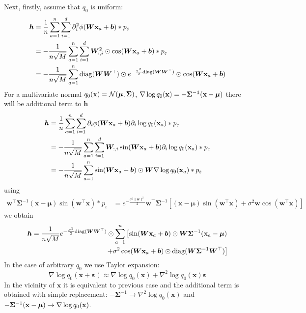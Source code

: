     Next, firstly, assume that $q_0$ is uniform:
    \begin{align*}
        {\bm h}
        &= \frac{1}{n}\sum_{a = 1}^n\sum_{i = 1}^d \partial_i^2 \phi(\bm{W}{\bf x}_a + \bm{b}) * p_{\varepsilon}\\
        &= -\frac{1}{n\sqrt{M}}\sum_{a = 1}^n\sum_{i = 1}^d \bm{W}_{:, i}^2 \odot \cos(\bm{W}{\bf x}_a + \bm{b}) * p_{\varepsilon}\\
        &= -\frac{1}{n\sqrt{M}}\sum_{a = 1}^n {\rm diag}(\bm{W}\bm{W}^{\top})\odot e^{-\frac{\sigma^2}{2}{\rm diag}(\bm{W}\bm{W}^{\top})} \odot \cos(\bm{W}{\bf x}_a + \bm{b})
    \end{align*}
    For a multivariate normal $q_0(\bf x) = {\cal N}({\bm \mu}, {\bm \Sigma})$, $\nabla\log q_0(\bf x) = -{\bm \Sigma}^{-1}({\bf x} - {\bm \mu})$ there will be additional term to ${\bm h}$
    \begin{align*}
        {\bm h}
        &= \frac{1}{n}\sum_{a = 1}^n\sum_{i = 1}^d \partial_i \phi(\bm{W}{\bf x}_a + \bm{b})\partial_i \log q_0({\bf x}_a) * p_{\varepsilon}\\
        &= -\frac{1}{n\sqrt{M}}\sum_{a = 1}^n\sum_{i = 1}^d \bm{W}_{:, i}\sin(\bm{W}{\bf x}_a + \bm{b})\partial_i \log q_0({\bf x}_a) * p_{\varepsilon}\\
        &= -\frac{1}{n\sqrt{M}} \sum_{a = 1}^n \sin(\bm{W}{\bf x}_a + \bm{b}) \odot \bm{W} \nabla\log q_0({\bf x}_a) * p_{\varepsilon}
    \end{align*}
    using
    \begin{align*}
    \mathbf{w}^\top {\bm \Sigma}^{-1}(\mathbf{x} - {\bm \mu}) \sin (\mathbf{w}^\top \mathbf{x}) * p_{\varepsilon}
    &=
    e^{-\frac{\sigma^2 \|\mathbf{w}\|^2}{2}}
    \mathbf{w}^\top{\bm \Sigma}^{-1}\left [
        (\mathbf{x} - {\bm \mu})\sin(\mathbf{w}^\top \mathbf{x}) + \sigma^2 \mathbf{w}\cos(\mathbf{w}^\top \mathbf{x})
    \right ]
    \end{align*}
    we obtain
    \begin{align}
        {\bm h} = \frac{1}{n\sqrt{M}}e^{-\frac{\sigma^2}{2}{\rm diag}(\bm{W}\bm{W}^{\top})} \odot \sum_{a = 1}^n \left[\sin(\bm{W}{\bf x}_a + \bm{b}) \odot {\bm W}{\bm \Sigma}^{-1}({\bf x}_a - {\bm \mu})
        \right . \nonumber\\
        \left .
        + \sigma^2\cos(\bm{W}{\bf x}_a + \bm{b})\odot {\rm diag}(\bm{W}{\bm \Sigma}^{-1}\bm{W}^{\top})
        \right]
    \end{align}
    In the case of arbitrary $q_0$ we use Taylor expansion:
    \begin{equation*}
        \nabla \log q_0(\mathbf{x} + {\bm \varepsilon}) \approx
        \nabla \log q_0(\mathbf{x}) + \nabla^2 \log q_0(\mathbf{x}) {\bm \varepsilon}
    \end{equation*}
    In the vicinity of $\mathbf{x}$ it is equivalent to previous case and the additional term is obtained with simple replacement: $-{\bm \Sigma}^{-1} \to \nabla^2 \log q_0(\mathbf{x})$ and $-{\bm \Sigma}^{-1}({\bf x} - {\bm \mu}) \to \nabla \log q_0(\mathbf{x})$.

